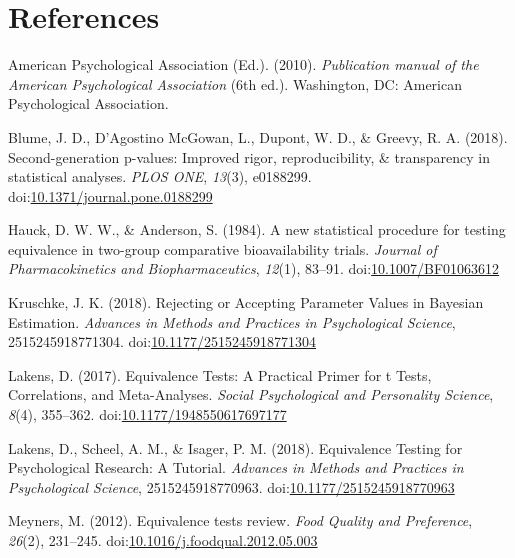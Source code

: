\documentclass[floatsintext,man]{apa6}
\theoremstyle{definition}
\theoremstyle{definition}
\theoremstyle{definition}
\theoremstyle{remark}
\begin{document}
\newpage

\section{References}\label{references}

\setlength{\parindent}{-0.5in} \setlength{\leftskip}{0.5in}

\hypertarget{refs}{}
\hypertarget{ref-american_psychological_association_publication_2010}{}
American Psychological Association (Ed.). (2010). \emph{Publication
manual of the American Psychological Association} (6th ed.). Washington,
DC: American Psychological Association.

\hypertarget{ref-blume_second-generation_2018}{}
Blume, J. D., D'Agostino McGowan, L., Dupont, W. D., \& Greevy, R. A.
(2018). Second-generation p-values: Improved rigor, reproducibility, \&
transparency in statistical analyses. \emph{PLOS ONE}, \emph{13}(3),
e0188299.
doi:\href{https://doi.org/10.1371/journal.pone.0188299}{10.1371/journal.pone.0188299}

\hypertarget{ref-hauck_new_1984}{}
Hauck, D. W. W., \& Anderson, S. (1984). A new statistical procedure for
testing equivalence in two-group comparative bioavailability trials.
\emph{Journal of Pharmacokinetics and Biopharmaceutics}, \emph{12}(1),
83--91.
doi:\href{https://doi.org/10.1007/BF01063612}{10.1007/BF01063612}

\hypertarget{ref-kruschke_rejecting_2018}{}
Kruschke, J. K. (2018). Rejecting or Accepting Parameter Values in
Bayesian Estimation. \emph{Advances in Methods and Practices in
Psychological Science}, 2515245918771304.
doi:\href{https://doi.org/10.1177/2515245918771304}{10.1177/2515245918771304}

\hypertarget{ref-lakens_equivalence_2017}{}
Lakens, D. (2017). Equivalence Tests: A Practical Primer for t Tests,
Correlations, and Meta-Analyses. \emph{Social Psychological and
Personality Science}, \emph{8}(4), 355--362.
doi:\href{https://doi.org/10.1177/1948550617697177}{10.1177/1948550617697177}

\hypertarget{ref-lakens_equivalence_2018}{}
Lakens, D., Scheel, A. M., \& Isager, P. M. (2018). Equivalence Testing
for Psychological Research: A Tutorial. \emph{Advances in Methods and
Practices in Psychological Science}, 2515245918770963.
doi:\href{https://doi.org/10.1177/2515245918770963}{10.1177/2515245918770963}

\hypertarget{ref-meyners_equivalence_2012}{}
Meyners, M. (2012). Equivalence tests review. \emph{Food Quality and
Preference}, \emph{26}(2), 231--245.
doi:\href{https://doi.org/10.1016/j.foodqual.2012.05.003}{10.1016/j.foodqual.2012.05.003}
\end{document}
